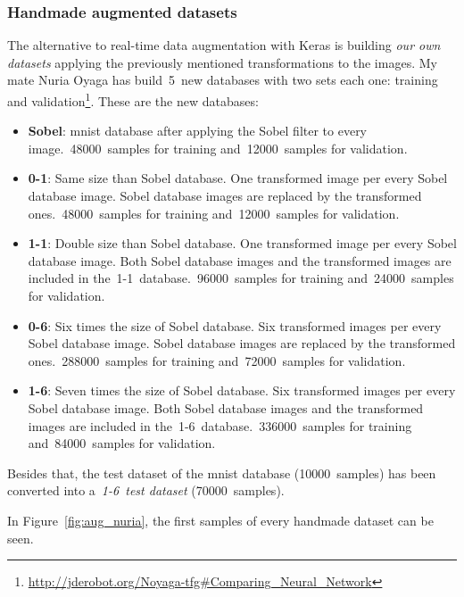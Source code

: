 \subsubsection{Handmade augmented datasets}\label{subsec:handmade}
The alternative to real-time data augmentation with Keras is building \emph{our own datasets} applying the previously mentioned transformations to the images. My mate Nuria Oyaga has build~5~new databases with two sets each one: training and validation\footnote{\url{http://jderobot.org/Noyaga-tfg\#Comparing_Neural_Network}}. These are the new databases: 
\begin{itemize}
	\item \textbf{Sobel}: \gls{mnist} database after applying the Sobel filter to every image.~48000~samples for training and~12000~samples for validation. 
	\item \textbf{0-1}: Same size than Sobel database. One transformed image per every Sobel database image. Sobel database images are replaced by the transformed ones.~48000~samples for training and~12000~samples for validation. 
	\item \textbf{1-1}: Double size than Sobel database. One transformed image per every Sobel database image. Both Sobel database images and the transformed images are included in the~1-1~database.~96000~samples for training and~24000~samples for validation. 
	\item \textbf{0-6}: Six times the size of Sobel database. Six transformed images per every Sobel database image. Sobel database images are replaced by the transformed ones.~288000~samples for training and~72000~samples for validation. 
	\item \textbf{1-6}: Seven times the size of Sobel database. Six transformed images per every Sobel database image. Both Sobel database images and the transformed images are included in the~1-6~database.~336000~samples for training and~84000~samples for validation. 
\end{itemize}

Besides that, the test dataset of the \gls{mnist} database (10000~samples) has been converted into a~\emph{1-6~test dataset} (70000~samples).

In Figure~\ref{fig:aug_nuria}, the first samples of every handmade dataset can be seen.

